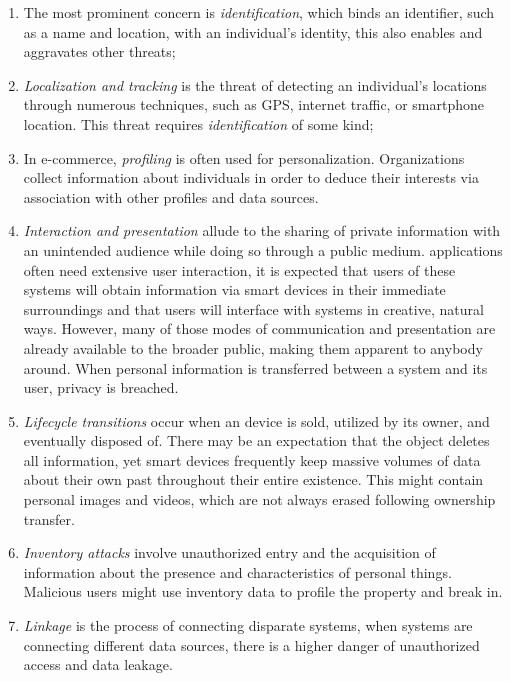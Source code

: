 \begin{enumerate}
    \item
    The most prominent concern is \textit{identification}, which binds an
    identifier, such as a name and location, with an individual's identity,
    this also enables and aggravates other threats;
    \item
    \textit{Localization and tracking} is the threat of detecting an individual's
    locations through numerous techniques, such as GPS, internet traffic,
    or smartphone location. This threat requires \textit{identification}
    of some kind;
    \item
    In e-commerce, \textit{profiling} is often used for personalization.
    Organizations collect information about individuals in order to deduce
    their interests via association with other profiles and data sources.
    \item
    \textit{Interaction and presentation} allude to the sharing of private
    information with an unintended audience while doing so through a public
    medium. \hyperlink{\acronym}{\acronym} applications often need extensive user interaction, it is
    expected that users of these systems will obtain information via smart
    devices in their immediate surroundings and that users will interface
    with systems in creative, natural ways. However, many of those modes
    of communication and presentation are already available to the broader
    public, making them apparent to anybody around. When personal information
    is transferred between a system and its user, privacy is breached.
    \item
    \textit{Lifecycle transitions} occur when an \hyperlink{\acronym}{\acronym} device is sold, utilized
    by its owner, and eventually disposed of. There may be an expectation
    that the object deletes all information, yet smart devices frequently
    keep massive volumes of data about their own past throughout their entire
    existence. This might contain personal images and videos, which are
    not always erased following ownership transfer.
    \item
    \textit{Inventory attacks} involve unauthorized entry and the acquisition
    of information about the presence and characteristics of personal things.
    Malicious users might use inventory data to profile the property and
    break in.
    \item
    \textit{Linkage} is the process of connecting disparate systems, when
    systems are connecting different data sources, there is a higher danger
    of unauthorized access and data leakage.
\end{enumerate}

